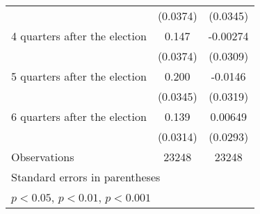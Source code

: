 \begin{table}[htbp]
\begin{tabular}{l*{2}{c}}
                    &    (0.0374)         &    (0.0345)         \\
[1em]
 4 quarters after the election&       0.147\sym{***}&    -0.00274         \\
                    &    (0.0374)         &    (0.0309)         \\
[1em]
 5 quarters after the election&       0.200\sym{***}&     -0.0146         \\
                    &    (0.0345)         &    (0.0319)         \\
[1em]
 6 quarters after the election&       0.139\sym{***}&     0.00649         \\
                    &    (0.0314)         &    (0.0293)         \\
\hline
Observations        &       23248         &       23248         \\
\hline\hline
\multicolumn{3}{l}{\footnotesize Standard errors in parentheses}\\
\multicolumn{3}{l}{\footnotesize \sym{*} \(p<0.05\), \sym{**} \(p<0.01\), \sym{***} \(p<0.001\)}\\
\end{tabular}
\end{table}
